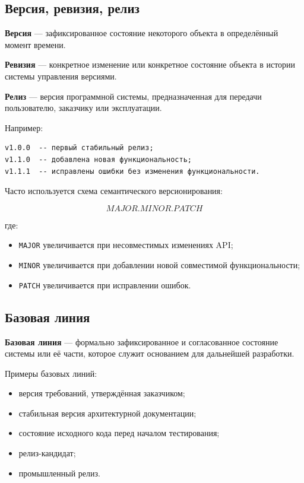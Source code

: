 \documentclass[12pt,a4paper]{article}
\begin{document}
\subsection{Версия, ревизия, релиз}

\textbf{Версия} --- зафиксированное состояние некоторого объекта в определённый момент времени.

\textbf{Ревизия} --- конкретное изменение или конкретное состояние объекта в истории системы управления версиями.

\textbf{Релиз} --- версия программной системы, предназначенная для передачи пользователю, заказчику или эксплуатации.

Например:

\begin{lstlisting}
v1.0.0  -- первый стабильный релиз;
v1.1.0  -- добавлена новая функциональность;
v1.1.1  -- исправлены ошибки без изменения функциональности.
\end{lstlisting}

Часто используется схема семантического версионирования:

\[
MAJOR.MINOR.PATCH
\]

где:

\begin{itemize}
    \item \texttt{MAJOR} увеличивается при несовместимых изменениях API;
    \item \texttt{MINOR} увеличивается при добавлении новой совместимой функциональности;
    \item \texttt{PATCH} увеличивается при исправлении ошибок.
\end{itemize}

\subsection{Базовая линия}

\textbf{Базовая линия} --- формально зафиксированное и согласованное состояние системы или её части, которое служит основанием для дальнейшей разработки.

Примеры базовых линий:

\begin{itemize}
    \item версия требований, утверждённая заказчиком;
    \item стабильная версия архитектурной документации;
    \item состояние исходного кода перед началом тестирования;
    \item релиз-кандидат;
    \item промышленный релиз.
\end{itemize}
\end{document}
